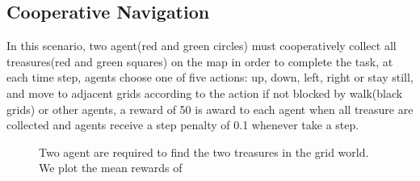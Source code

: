 \documentclass{article} %
\begin{document}
\subsection{Cooperative Navigation}
In this scenario, two agent(red and green circles) must cooperatively collect all treasures(red and green squares) on the map in order to complete the task, at each time step, agents choose one of five actions: up, down, left, right or stay still, and move to adjacent grids according to the action if not blocked by walk(black grids) or other agents, a reward of 50 is award to each agent when all treasure are collected and agents receive a step penalty of 0.1 whenever take a step.
\begin{figure}
\centering
    \caption{Two agent are required to find the two treasures in the grid world. We plot the mean rewards of}
    \label{Cooperative Navigation}
\end{figure}
\end{document}
